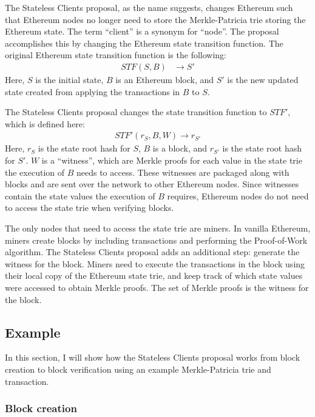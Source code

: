 \documentclass[12pt]{article}
\newcommand{\System}{Stateless Clients\xspace}
\begin{document}
The \System proposal, as the name suggests, changes Ethereum such that Ethereum nodes no longer need to store the Merkle-Patricia trie storing the Ethereum state. The term ``client'' is a synonym for ``node''. The proposal accomplishes this by changing the Ethereum state transition function. The original Ethereum state transition function is the following:
\begin{align*}
  STF(S, B) &\to S'
\end{align*}
Here, $S$ is the initial state, $B$ is an Ethereum block, and $S'$ is the new updated state created from applying the transactions in $B$ to $S$.

The \System proposal changes the state transition function to $STF'$, which is defined here:
\begin{align*}
  STF'(r_S, B, W) \to r_{S'}
\end{align*}
Here, $r_S$ is the state root hash for $S$, $B$ is a block, and $r_{S'}$ is the state root hash for $S'$. $W$ is a ``witness'', which are Merkle proofs for each value in the state trie the execution of $B$ needs to access. These witnesses are packaged along with blocks and are sent over the network to other Ethereum nodes. Since witnesses contain the state values the execution of $B$ requires, Ethereum nodes do not need to access the state trie when verifying blocks.

The only nodes that need to access the state trie are miners. In vanilla Ethereum, miners create blocks by including transactions and performing the Proof-of-Work algorithm. The \System proposal adds an additional step: generate the witness for the block. Miners need to execute the transactions in the block using their local copy of the Ethereum state trie, and keep track of which state values were accessed to obtain Merkle proofs. The set of Merkle proofs is the witness for the block.

\subsection{Example}

In this section, I will show how the \System proposal works from block creation to block verification using an example Merkle-Patricia trie and transaction.

\subsubsection{Block creation}
\end{document}
